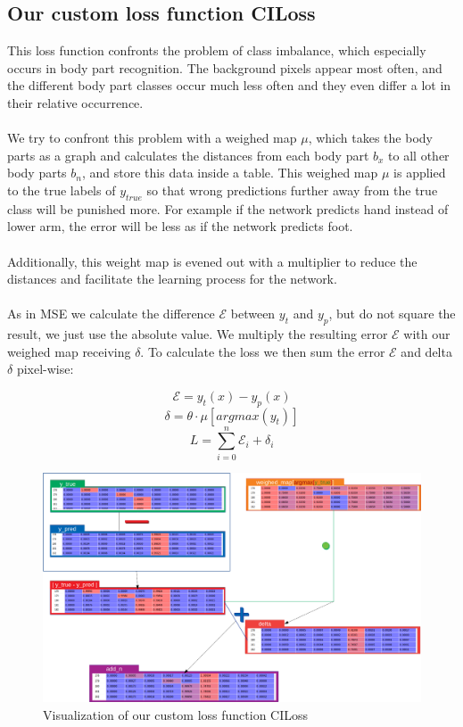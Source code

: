 \subsection{Our custom loss function CILoss}
\label{ciloss}
This loss function confronts the problem of class imbalance, which especially occurs in body part recognition.
The background pixels appear most often, and the different body part classes occur much less often and they even
differ a lot in their relative occurrence.
\\\mbox{}\\
We try to confront this problem with a weighed map $\mu$, which takes the body parts as a graph and calculates
the distances from each body part $b_x$ to all other body parts $b_n$, and store this data inside a table.
This weighed map $\mu$ is applied to the true labels of $y_{true}$ so that wrong predictions further away from the true
class will be punished more. For example if the network predicts hand instead of lower arm, the error will be less as if
the network predicts foot.
\\\mbox{}\\
Additionally, this weight map is evened out with a multiplier to reduce the distances and facilitate
the learning process for the network.
\\\mbox{}\\
As in MSE we calculate the difference $\mathcal{E}$ between $y_t$ and $y_p$, but do not square the result, we just use the absolute value.
We multiply the resulting error $\mathcal{E}$ with our weighed map receiving $\delta$.
To calculate the loss we then sum the error $\mathcal{E}$ and delta $\delta$ pixel-wise:

$$\mathcal{E}=y_t(x)-y_p(x)$$
$$\delta=\theta\cdot\mu[argmax(y_t)] $$
$$L=\sum_{i=0}^{n}\mathcal{E}_i+\delta_i$$


\begin{figure}[H]
    \centering
    \includegraphics[width=\textwidth,height=\textheight,keepaspectratio]{img/loss_calculation.png}
    \decoRule
    \caption[Loss Functions CILoss: Calculation]{Visualization of our custom loss function CILoss}
    \label{fig:ciloss-calc}
\end{figure}
